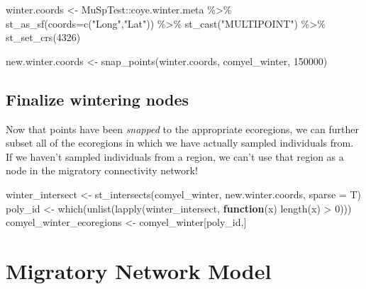 \documentclass[
]{book}
\newenvironment{Shaded}{\begin{snugshade}}{\end{snugshade}}
\newcommand{\AttributeTok}[1]{\textcolor[rgb]{0.77,0.63,0.00}{#1}}
\newcommand{\ControlFlowTok}[1]{\textcolor[rgb]{0.13,0.29,0.53}{\textbf{#1}}}
\newcommand{\DecValTok}[1]{\textcolor[rgb]{0.00,0.00,0.81}{#1}}
\newcommand{\FunctionTok}[1]{\textcolor[rgb]{0.00,0.00,0.00}{#1}}
\newcommand{\NormalTok}[1]{#1}
\newcommand{\OtherTok}[1]{\textcolor[rgb]{0.56,0.35,0.01}{#1}}
\newcommand{\SpecialCharTok}[1]{\textcolor[rgb]{0.00,0.00,0.00}{#1}}
\newcommand{\StringTok}[1]{\textcolor[rgb]{0.31,0.60,0.02}{#1}}
\begin{document}
\begin{Shaded}
\begin{Highlighting}[]
\NormalTok{winter.coords }\OtherTok{\textless{}{-}}\NormalTok{ MuSpTest}\SpecialCharTok{::}\NormalTok{coye.winter.meta }\SpecialCharTok{\%\textgreater{}\%}
  \FunctionTok{st\_as\_sf}\NormalTok{(}\AttributeTok{coords=}\FunctionTok{c}\NormalTok{(}\StringTok{"Long"}\NormalTok{,}\StringTok{"Lat"}\NormalTok{)) }\SpecialCharTok{\%\textgreater{}\%}
  \FunctionTok{st\_cast}\NormalTok{(}\StringTok{"MULTIPOINT"}\NormalTok{) }\SpecialCharTok{\%\textgreater{}\%}
  \FunctionTok{st\_set\_crs}\NormalTok{(}\DecValTok{4326}\NormalTok{)}
  
\NormalTok{new.winter.coords }\OtherTok{\textless{}{-}} \FunctionTok{snap\_points}\NormalTok{(winter.coords, comyel\_winter, }\DecValTok{150000}\NormalTok{)}
\end{Highlighting}
\end{Shaded}

\hypertarget{finalize-wintering-nodes}{%
\section{Finalize wintering nodes}\label{finalize-wintering-nodes}}

Now that points have been \emph{snapped} to the appropriate ecoregions, we can further subset all of the ecoregions in which we have actually sampled individuals from. If we haven't sampled individuals from a region, we can't use that region as a node in the migratory connectivity network!

\begin{Shaded}
\begin{Highlighting}[]
\NormalTok{winter\_intersect }\OtherTok{\textless{}{-}} \FunctionTok{st\_intersects}\NormalTok{(comyel\_winter, new.winter.coords, }\AttributeTok{sparse =}\NormalTok{ T)}
\NormalTok{poly\_id }\OtherTok{\textless{}{-}} \FunctionTok{which}\NormalTok{(}\FunctionTok{unlist}\NormalTok{(}\FunctionTok{lapply}\NormalTok{(winter\_intersect, }\ControlFlowTok{function}\NormalTok{(x) }\FunctionTok{length}\NormalTok{(x) }\SpecialCharTok{\textgreater{}} \DecValTok{0}\NormalTok{)))}
\NormalTok{comyel\_winter\_ecoregions }\OtherTok{\textless{}{-}}\NormalTok{ comyel\_winter[poly\_id,]}
\end{Highlighting}
\end{Shaded}

\hypertarget{connectivity}{%
\chapter{Migratory Network Model}\label{connectivity}}
\end{document}
